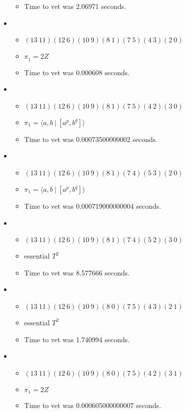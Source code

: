 \documentclass{article}
\begin{document}
\begin{itemize}
\begin{itemize}
      \item Time to vet was 2.06971 seconds.
\end{itemize}
\item \begin{itemize}
      \item $(13\ 11)(12\ 6)(10\ 9)(8\ 1)(7\ 5)(4\ 3)(2\ 0)$
      \item $\pi_1 =2 Z$
      \item Time to vet was 0.000608 seconds.
\end{itemize}
\item \begin{itemize}
      \item $(13\ 11)(12\ 6)(10\ 9)(8\ 1)(7\ 5)(4\ 2)(3\ 0)$
      \item $\pi_1 = \langle a,b\ |\ [a^p,b^q]\rangle$
      \item Time to vet was 0.00073500000002 seconds.
\end{itemize}
\item \begin{itemize}
      \item $(13\ 11)(12\ 6)(10\ 9)(8\ 1)(7\ 4)(5\ 3)(2\ 0)$
      \item $\pi_1 = \langle a,b\ |\ [a^p,b^q]\rangle$
      \item Time to vet was 0.000719000000004 seconds.
\end{itemize}
\item \begin{itemize}
      \item $(13\ 11)(12\ 6)(10\ 9)(8\ 1)(7\ 4)(5\ 2)(3\ 0)$
      \item essential $T^2$
      \item Time to vet was 8.577666 seconds.
\end{itemize}
\item \begin{itemize}
      \item $(13\ 11)(12\ 6)(10\ 9)(8\ 0)(7\ 5)(4\ 3)(2\ 1)$
      \item essential $T^2$
      \item Time to vet was 1.740994 seconds.
\end{itemize}
\item \begin{itemize}
      \item $(13\ 11)(12\ 6)(10\ 9)(8\ 0)(7\ 5)(4\ 2)(3\ 1)$
      \item $\pi_1 =2 Z$
      \item Time to vet was 0.000605000000007 seconds.

\end{itemize}
\end{itemize}
\end{document}
